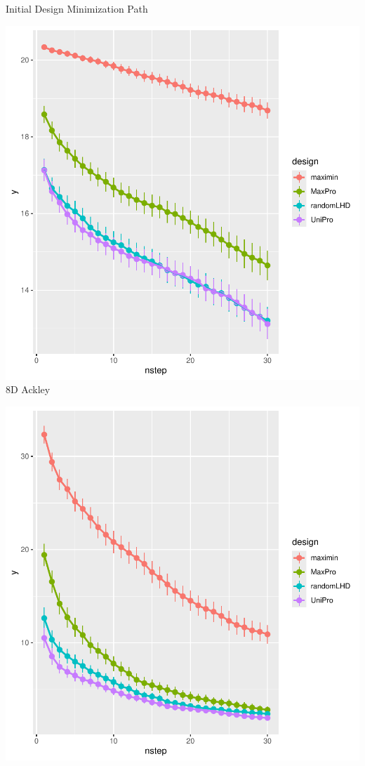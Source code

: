 \documentclass{beamer}
\begin{document}
\begin{frame}{Initial Design Minimization Path}
\begin{minipage}{0.32\textwidth}
\centering
\includegraphics[width=\textwidth]{../chapters/EGO/pdfs/ackley8_lineplot1}
\small {8D Ackley}
\end{minipage}
\hfill
\begin{minipage}{0.32\textwidth}
\centering
\includegraphics[width=\textwidth]{../chapters/EGO/pdfs/levy8_lineplot1}

\end{minipage}
\end{frame}
\end{document}
